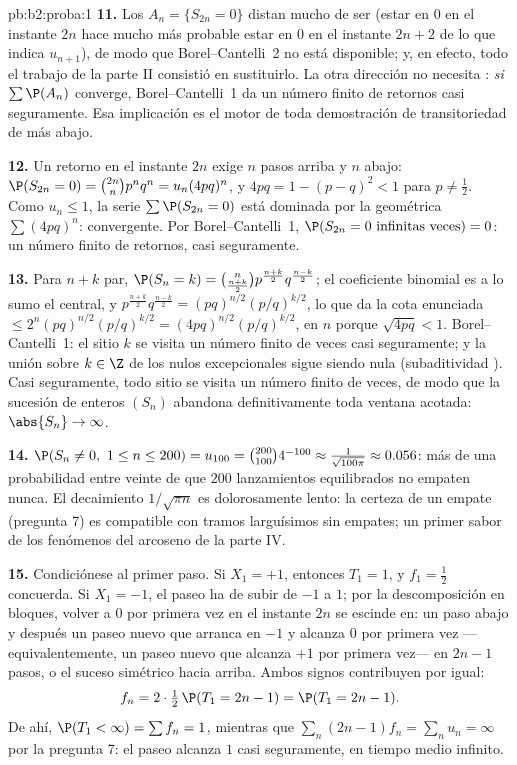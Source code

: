 \begin{solution}{pb:b2:proba:1}
\textbf{11.} Los  $A_n = \{S_{2n} = 0\}$ distan mucho de ser
 (estar en $0$ en el instante $2n$ hace mucho más
probable estar en $0$ en el instante $2n + 2$ de lo que indica
$u_{n+1}$), de modo que Borel--Cantelli~2 no está disponible; y, en
efecto, todo el trabajo de la parte II consistió en sustituirlo. La
otra dirección no necesita : \emph{si} $\sum\P(A_n)$
converge, Borel--Cantelli~1 da un número finito de retornos casi
seguramente. Esa implicación es el motor de toda demostración de
transitoriedad de más abajo.

\textbf{12.} Un retorno en el instante $2n$ exige $n$ pasos arriba y
$n$ abajo: $\P(S_{2n} = 0) = \binom{2n}np^nq^n = u_n(4pq)^n$, y $4pq
= 1 - (p - q)^2 < 1$ para $p \neq \frac12$. Como $u_n \leq 1$, la
serie $\sum\P(S_{2n} = 0)$ está dominada por la geométrica
$\sum(4pq)^n$: convergente. Por Borel--Cantelli~1, $\P(S_{2n} = 0
\text{ infinitas veces}) = 0$: un número finito de retornos, casi
seguramente.

\textbf{13.} Para $n + k$ par, $\P(S_n = k) =
\binom{n}{\frac{n+k}2}p^{\frac{n+k}2}q^{\frac{n-k}2}$; el coeficiente
binomial es a lo sumo el central, y $p^{\frac{n+k}2}q^{\frac{n-k}2} =
(pq)^{n/2}(p/q)^{k/2}$, lo que da la cota enunciada $\leq
2^n(pq)^{n/2}(p/q)^{k/2} = (4pq)^{n/2}(p/q)^{k/2}$,  en $n$
porque $\sqrt{4pq} < 1$. Borel--Cantelli~1: el sitio $k$ se visita un
número finito de veces casi seguramente; y la unión sobre $k \in \Z$
de los  nulos excepcionales sigue siendo nula (subaditividad
). Casi seguramente, todo sitio se visita un número finito
de veces, de modo que la sucesión de enteros $(S_n)$ abandona
definitivamente toda ventana acotada: $\abs{S_n} \to \infty$.

\textbf{14.} $\P(S_n \neq 0,\ 1 \leq n \leq 200) = u_{100} =
\binom{200}{100}4^{-100} \approx \frac1{\sqrt{100\pi}} \approx
0.056$: más de una probabilidad entre veinte de que $200$
lanzamientos equilibrados no empaten nunca. El decaimiento
$1/\sqrt{\pi n}$ es dolorosamente lento: la certeza de un empate
(pregunta 7) es compatible con tramos larguísimos sin empates; un
primer sabor de los fenómenos del arcoseno de la parte IV.

\textbf{15.} Condiciónese al primer paso. Si $X_1 = +1$, entonces
$T_1 = 1$, y $f_1 = \frac12$ concuerda. Si $X_1 = -1$, el paseo ha de
subir de $-1$ a $1$; por la descomposición en bloques, volver a $0$
por primera vez en el instante $2n$ se escinde en: un paso abajo y
después un paseo nuevo que arranca en $-1$ y alcanza $0$ por primera
vez ---equivalentemente, un paseo nuevo que alcanza $+1$ por primera
vez--- en $2n - 1$ pasos, o el suceso simétrico hacia arriba. Ambos
signos contribuyen por igual:
\[
f_n = 2\cdot\tfrac12\,\P(T_1 = 2n - 1) = \P(T_1 = 2n-1) .
\]
De ahí, $\P(T_1 < \infty) = \sum f_n = 1$, mientras que $\sum_n(2n -
1)f_n = \sum_n u_n = \infty$ por la pregunta 7: el paseo alcanza $1$
casi seguramente, en tiempo medio infinito.


\end{solution}
